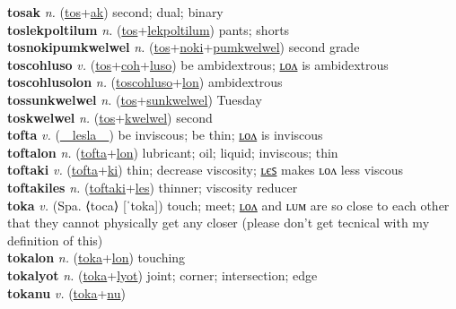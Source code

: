 \textbf{tosak} \textit{n.} (\hyperref[tos]{tos}+\hyperref[ak]{ak})
second; dual; binary \label{tosak} \\
\textbf{toslekpoltilum} \textit{n.} (\hyperref[tos]{tos}+\hyperref[lekpoltilum]{lekpoltilum})
pants; shorts \label{toslekpoltilum} \\
\textbf{tosnokipumkwelwel} \textit{n.} (\hyperref[tos]{tos}+\hyperref[noki]{noki}+\hyperref[pumkwelwel]{pumkwelwel})
second grade \label{tosnokipumkwelwel} \\
\textbf{toscohluso} \textit{v.} (\hyperref[tos]{tos}+\hyperref[coh]{coh}+\hyperref[luso]{luso})
be ambidextrous; \hyperref[toscohlusolon]{ʟᴏᴧ} is ambidextrous \label{toscohluso} \\
\textbf{toscohlusolon} \textit{n.} (\hyperref[toscohluso]{toscohluso}+\hyperref[lon]{lon})
ambidextrous \label{toscohlusolon} \\
\textbf{tossunkwelwel} \textit{n.} (\hyperref[tos]{tos}+\hyperref[sunkwelwel]{sunkwelwel})
Tuesday \label{tossunkwelwel} \\
\textbf{toskwelwel} \textit{n.} (\hyperref[tos]{tos}+\hyperref[kwelwel]{kwelwel})
second \label{toskwelwel} \\
\textbf{tofta} \textit{v.} (\hyperref[lesla]{~~lesla~~})
be inviscous; be thin; \hyperref[toftalon]{ʟᴏᴧ} is inviscous \label{tofta} \\
\textbf{toftalon} \textit{n.} (\hyperref[tofta]{tofta}+\hyperref[lon]{lon})
lubricant; oil; liquid; inviscous; thin \label{toftalon} \\
\textbf{toftaki} \textit{v.} (\hyperref[tofta]{tofta}+\hyperref[ki]{ki})
thin; decrease viscosity; \hyperref[toftakiles]{ʟєꜱ} makes ʟᴏᴧ less viscous \label{toftaki} \\
\textbf{toftakiles} \textit{n.} (\hyperref[toftaki]{toftaki}+\hyperref[les]{les})
thinner; viscosity reducer \label{toftakiles} \\
\textbf{toka} \textit{v.} (Spa. ⟨toca⟩ [ˈtoka])
touch; meet; \hyperref[tokalon]{ʟᴏᴧ} and ʟᴜᴍ are so close to each other that they cannot physically get any closer (please don’t get tecnical with my definition of this) \label{toka} \\
\textbf{tokalon} \textit{n.} (\hyperref[toka]{toka}+\hyperref[lon]{lon})
touching \label{tokalon} \\
\textbf{tokalyot} \textit{n.} (\hyperref[toka]{toka}+\hyperref[lyot]{lyot})
joint; corner; intersection; edge \label{tokalyot} \\
\textbf{tokanu} \textit{v.} (\hyperref[toka]{toka}+\hyperref[nu]{nu})
